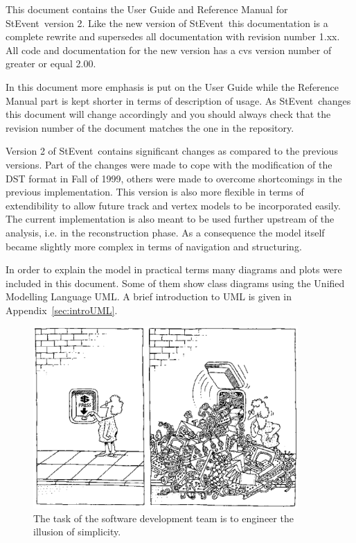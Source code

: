\documentclass[twoside]{article}
\newcommand{\StEvent}{\textsf{StEvent}}
\begin{document}
This document contains the User Guide and Reference Manual for
\StEvent\ version 2. Like the new version of \StEvent\ this
documentation is a complete rewrite and supersedes all documentation
with revision number 1.xx. All code and documentation for the new
version has a cvs version number of greater or equal 2.00.

In this document more emphasis is put on the User Guide while the
Reference Manual part is kept shorter in terms of description of
usage.  As \StEvent\ changes this document will change accordingly and
you should always check that the revision number of the document
matches the one in the repository.

Version 2 of \StEvent\ contains significant changes as compared to the
previous versions. Part of the changes were made to cope with the
modification of the DST format in Fall of 1999, others were made to
overcome shortcomings in the previous implementation. This version is
also more flexible in terms of extendibility to allow future track and
vertex models to be incorporated easily.  The current implementation
is also meant to be used further upstream of the analysis, i.e. in the
reconstruction phase.  As a consequence the model itself became
slightly more complex in terms of navigation and structuring.

In order to explain the model in practical terms many diagrams and
plots were included in this document. Some of them show class diagrams
using the Unified Modelling Language UML. A brief introduction to UML
is given in Appendix~\ref{sec:introUML}.
\begin{figure}[hb]
    \begin{center}
        \includegraphics[width=0.9\textwidth]{cartoon1.eps}
        \caption{The task of the software development team is to
            engineer the illusion of simplicity.}
    \end{center}
\end{figure}
\end{document}
